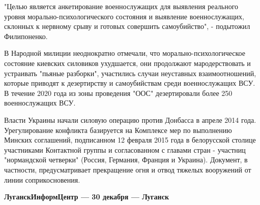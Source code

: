 "Целью является анкетирование военнослужащих для выявления реального уровня
морально-психологического состояния и выявление военнослужащих, склонных к
нервному срыву и готовых совершить самоубийство", - подытожил Филипоненко.

В Народной милиции неоднократно отмечали, что морально-психологическое
состояние киевских силовиков ухудшается, они продолжают мародерствовать и
устраивать "пьяные разборки", участились случаи неуставных взаимоотношений,
которые приводят к дезертирству и самоубийствам среди военнослужащих ВСУ. В
течение 2020 года из зоны проведения "ООС" дезертировали более 250
военнослужащих ВСУ.

Власти Украины начали силовую операцию против Донбасса в апреле 2014 года.
Урегулирование конфликта базируется на Комплексе мер по выполнению Минских
соглашений, подписанном 12 февраля 2015 года в белорусской столице участниками
Контактной группы и согласованном с главами стран - участниц "нормандской
четверки" (Россия, Германия, Франция и Украина). Документ, в частности,
предусматривает прекращение огня и отвод тяжелых вооружений от линии
соприкосновения.

{\bfseries 
ЛуганскИнформЦентр — 30 декабря — Луганск
}


